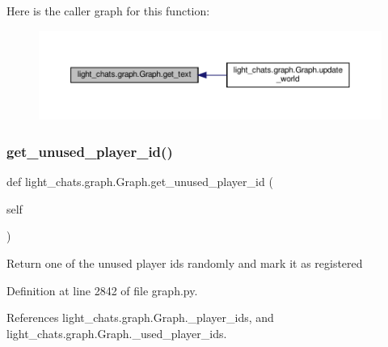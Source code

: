 Here is the caller graph for this function\+:
\nopagebreak
\begin{figure}[H]
\begin{center}
\leavevmode
\includegraphics[width=350pt]{classlight__chats_1_1graph_1_1Graph_a63268fea99420b5cb83436499cd0676b_icgraph}
\end{center}
\end{figure}
\mbox{\label{classlight__chats_1_1graph_1_1Graph_a89bb38305c3d42c4ce2ae8dcc966ab6e}} 
\subsubsection{\texorpdfstring{get\+\_\+unused\+\_\+player\+\_\+id()}{get\_unused\_player\_id()}}
{\footnotesize\ttfamily def light\+\_\+chats.\+graph.\+Graph.\+get\+\_\+unused\+\_\+player\+\_\+id (\begin{DoxyParamCaption}\item[{}]{self }\end{DoxyParamCaption})}

\begin{DoxyVerb}Return one of the unused player ids randomly and mark it as registered
\end{DoxyVerb}
 

Definition at line 2842 of file graph.\+py.



References light\+\_\+chats.\+graph.\+Graph.\+\_\+player\+\_\+ids, and light\+\_\+chats.\+graph.\+Graph.\+\_\+used\+\_\+player\+\_\+ids.

\mbox{\label{classlight__chats_1_1graph_1_1Graph_aa8a44c495d154f033ea3ced4d6f2e85d}} 
